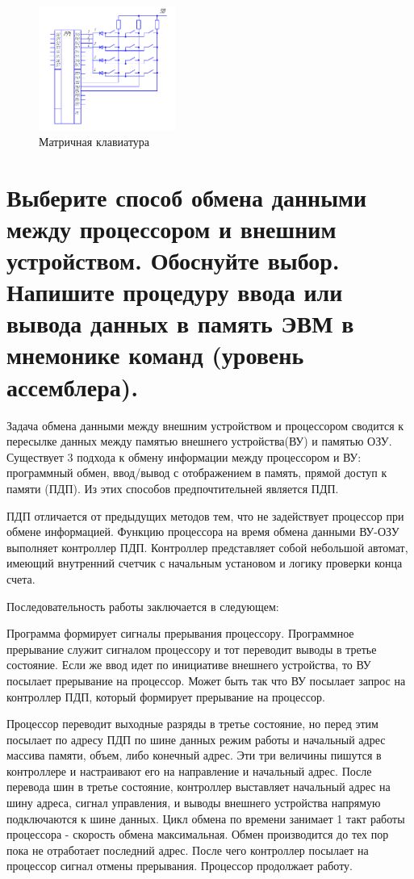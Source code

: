 \documentclass[unicode, 12pt, a4paper, oneside]{article}
\begin{document}
\begin{figure}[H]
\centering
\includegraphics[width=0.4\textwidth]{106_Keyboard.png}
\caption{Матричная клавиатура}
\end{figure}

\section{Выберите способ обмена данными между процессором и внешним устройством. Обоснуйте выбор. Напишите процедуру ввода или вывода данных в память ЭВМ в мнемонике команд (уровень ассемблера).}

Задача обмена данными между внешним устройством и процессором сводится к пересылке данных между памятью внешнего устройства(ВУ) и памятью ОЗУ. Существует 3 подхода к обмену информации между процессором и ВУ: программный обмен, ввод/вывод с отображением в память, прямой доступ к памяти (ПДП). Из этих способов предпочтительней является ПДП.

ПДП отличается от предыдущих методов тем, что не задействует процессор при обмене информацией. Функцию процессора на время обмена данными ВУ-ОЗУ выполняет контроллер ПДП. Контроллер представляет собой небольшой автомат, имеющий внутренний счетчик с начальным установом и логику проверки конца счета. 

Последовательность работы заключается в следующем:

Программа формирует сигналы прерывания процессору. Программное прерывание служит сигналом процессору и тот переводит выводы в третье состояние. Если же ввод идет по инициативе внешнего устройства, то ВУ посылает прерывание на процессор. Может быть так что ВУ посылает запрос на контроллер ПДП, который формирует прерывание на процессор. 

Процессор переводит выходные разряды в третье состояние, но перед этим посылает по адресу ПДП по шине данных режим работы и начальный адрес массива памяти, объем, либо конечный адрес. Эти три величины пишутся в контроллере и настраивают его на направление и начальный адрес. После перевода шин в третье состояние, контроллер выставляет начальный адрес на шину адреса, сигнал управления, и выводы внешнего устройства напрямую подключаются к шине данных. Цикл обмена по времени занимает 1 такт работы процессора - скорость обмена максимальная. Обмен производится до тех пор пока не отработает последний адрес. После чего контроллер посылает на процессор сигнал отмены прерывания. Процессор продолжает работу.
\end{document}
